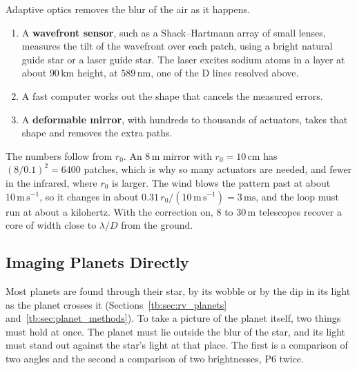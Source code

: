Adaptive optics removes the blur of the air as it happens.
\begin{enumerate}
	\item A \textbf{wavefront sensor}, such as a Shack--Hartmann array of small lenses, measures the tilt of the wavefront over each patch, using a bright natural guide star or a laser guide star. The laser excites sodium atoms in a layer at about $90\,\mathrm{km}$ height, at $589\,\mathrm{nm}$, one of the D lines resolved above.
	\item A fast computer works out the shape that cancels the measured errors.
	\item A \textbf{deformable mirror}, with hundreds to thousands of actuators, takes that shape and removes the extra paths.
\end{enumerate}
The numbers follow from $r_0$. An $8\,\mathrm m$ mirror with $r_0=10\,\mathrm{cm}$ has $(8/0.1)^2=6400$ patches, which is why so many actuators are needed, and fewer in the infrared, where $r_0$ is larger. The wind blows the pattern past at about $10\,\mathrm{m\,s^{-1}}$, so it changes in about $0.31\,r_0/(10\,\mathrm{m\,s^{-1}})=3\,\mathrm{ms}$, and the loop must run at about a kilohertz. With the correction on, $8$ to $30\,\mathrm m$ telescopes recover a core of width close to $\lambda/D$ from the ground.

\subsection{Imaging Planets Directly}
\label{re:sec:direct_imaging}

Most planets are found through their star, by its wobble or by the dip in its light as the planet crosses it (Sections~\ref{tb:sec:rv_planets} and~\ref{tb:sec:planet_methods}). To take a picture of the planet itself, two things must hold at once. The planet must lie outside the blur of the star, and its light must stand out against the star's light at that place. The first is a comparison of two angles and the second a comparison of two brightnesses, P6 twice.

